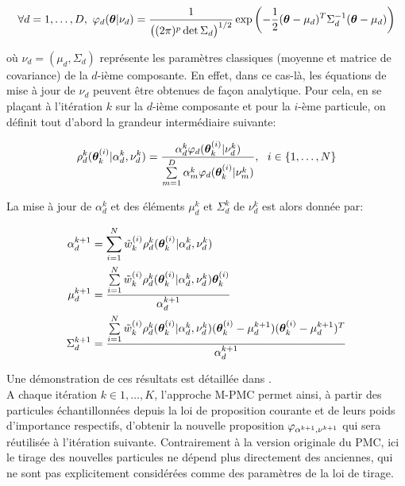 \begin{equation}
	{
	\forall d = 1, \dots, D, ~ {\varphi}_d({\bm{\theta}}|\nu_d) = \dfrac{1}{\bigl((2\pi)^p\det \Sigma_d\bigr)^{1/2}}\exp\left(-\dfrac{1}{2}({\bm{\theta}}- \mu_d)^T \Sigma_d^{-1}({\bm{\theta}}- \mu_d)\right)
	\label{eq_def_multivariate_gaussian}
	}
\end{equation}

où $\nu_d = (\mu_d, \Sigma_d)$ représente les paramètres classiques (moyenne et matrice de covariance) de la $d$-ième composante. En effet, dans ce cas-là, les équations de mise à jour de $\nu_d$ peuvent être obtenues de façon analytique. Pour cela, en se plaçant à l'itération $k$ sur la $d$-ième composante et pour la $i$-ème particule, on définit tout d'abord la grandeur intermédiaire suivante:

\begin{equation}
	\rho_d^k({\bm{\theta}}_k^{(i)} | \alpha_d^k , \nu_d^k) = \dfrac{\alpha_d^k \varphi_d({\bm{\theta}}_k^{(i)} | \nu_d^k)}{\sum\limits_{m=1}^D\alpha_m^k \varphi_d({\bm{\theta}}_k^{(i)} | \nu_m^k)}, ~~ i \in \{1, \dots, N\}
\end{equation}

La mise à jour de $\alpha_d^k$ et des éléments $\mu_d^k$ et $\Sigma_d^k$ de $\nu_d^k$ est alors donnée par:

\begin{equation}
	\begin{split}
	\alpha_d^{k+1}  &= \sum\limits_{i=1}^N \tilde{w}_k^{(i)} \rho_d^k({\bm{\theta}}_k^{(i)} | \alpha_d^k , \nu_d^k) \\
	\mu_d^{k+1} &= \dfrac{\sum\limits_{i=1}^N\tilde{w}_k^{(i)} \rho_d^k({\bm{\theta}}_k^{(i)} | \alpha_d^k , \nu_d^k) {\bm{\theta}}_k^{(i)}}{\alpha_d^{k+1} } \\
	\Sigma_d^{k+1} &= \dfrac{\sum\limits_{i=1}^N \tilde{w}_k^{(i)} \rho_d^k({\bm{\theta}}_k^{(i)} | \alpha_d^k , \nu_d^k)({\bm{\theta}}_k^{(i)} - \mu_d^{k+1})({\bm{\theta}}_k^{(i)} - \mu_d^{k+1})^T }{\alpha_d^{k+1}}
	\end{split}
	\label{eq_maj_gaussien}
\end{equation}


Une démonstration de ces résultats est détaillée dans {\cite{Douc2007}.} \\


A chaque itération $k \in {1, \dots, K}$, l'approche M-PMC permet ainsi, à partir des particules échantillonnées depuis la loi de proposition courante et de leurs poids d'importance respectifs, d'obtenir la nouvelle proposition ${\varphi}_{\alpha^{k+1}, \nu^{k+1}}$ qui sera réutilisée à l'itération suivante. Contrairement à la version originale du PMC, ici le tirage des nouvelles particules ne dépend plus directement des anciennes, qui ne sont pas explicitement considérées comme des paramètres de la loi de tirage. \\

